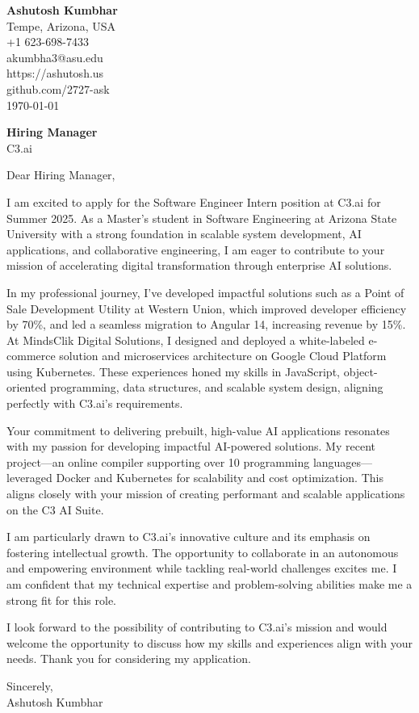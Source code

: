 \documentclass[11pt]{article}
\begin{document}
\begin{flushleft}
\textbf{Ashutosh Kumbhar} \\
Tempe, Arizona, USA \\
+1 623-698-7433 \\
akumbha3@asu.edu \\
https://ashutosh.us \\
github.com/2727-ask \\
\today
\end{flushleft}

\vspace{0.5em}

\textbf{Hiring Manager} \\
C3.ai \\

\vspace{1em}

Dear Hiring Manager,

I am excited to apply for the Software Engineer Intern position at C3.ai for Summer 2025. As a Master’s student in Software Engineering at Arizona State University with a strong foundation in scalable system development, AI applications, and collaborative engineering, I am eager to contribute to your mission of accelerating digital transformation through enterprise AI solutions.

In my professional journey, I’ve developed impactful solutions such as a Point of Sale Development Utility at Western Union, which improved developer efficiency by 70\%, and led a seamless migration to Angular 14, increasing revenue by 15\%. At MindsClik Digital Solutions, I designed and deployed a white-labeled e-commerce solution and microservices architecture on Google Cloud Platform using Kubernetes. These experiences honed my skills in JavaScript, object-oriented programming, data structures, and scalable system design, aligning perfectly with C3.ai's requirements.

Your commitment to delivering prebuilt, high-value AI applications resonates with my passion for developing impactful AI-powered solutions. My recent project—an online compiler supporting over 10 programming languages—leveraged Docker and Kubernetes for scalability and cost optimization. This aligns closely with your mission of creating performant and scalable applications on the C3 AI Suite.

I am particularly drawn to C3.ai’s innovative culture and its emphasis on fostering intellectual growth. The opportunity to collaborate in an autonomous and empowering environment while tackling real-world challenges excites me. I am confident that my technical expertise and problem-solving abilities make me a strong fit for this role.

I look forward to the possibility of contributing to C3.ai's mission and would welcome the opportunity to discuss how my skills and experiences align with your needs. Thank you for considering my application.

Sincerely, \\
Ashutosh Kumbhar
\end{document}
